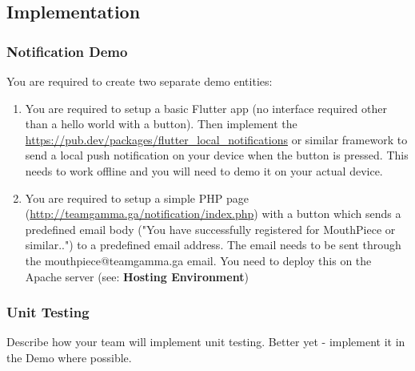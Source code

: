\documentclass{article}
\begin{document}
\newpage

\subsection{Implementation}
\subsubsection{Notification Demo}
You are required to create two separate demo entities:

\begin{enumerate}
    \item You are required to setup a basic Flutter app (no interface required other than a hello world with a button). Then implement the \url{https://pub.dev/packages/flutter_local_notifications} or similar framework to send a local push notification on your device when the button is pressed. This needs to work offline and you will need to demo it on your actual device. 
    \item You are required to setup a simple PHP page (\url{http://teamgamma.ga/notification/index.php}) with a button which sends a predefined email body ("You have successfully registered for MouthPiece or similar..") to a predefined email address. The email needs to be sent through the mouthpiece@teamgamma.ga email. You need to deploy this on the Apache server (see: \textbf{Hosting Environment})
\end{enumerate}

\subsubsection{Unit Testing}
Describe how your team will implement unit testing. Better yet - implement it in the Demo where possible.
\end{document}
